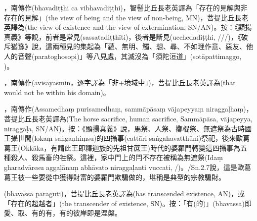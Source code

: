 \startitemgroup[noteitems]
\item{}，南傳作(bhavadiṭṭhi ca vibhavadiṭṭhi)，智髻比丘長老英譯為「存在的見解與非存在的見解」(the view of being and the view of non-being, MN)，菩提比丘長老英譯為(the view of existence and the view of extermination, SN/AN)。按：《顯揚真義》等說，前者是常見(sassatadiṭṭhīti)，後者是斷見(ucchedadiṭṭhi, ///)，《破斥猶豫》說，這兩種見的集起為「蘊、無明、觸、想、尋、不如理作意、惡友、他人的音聲(paratoghosopi)」等八見處，其滅沒為「須陀洹道」(sotāpattimaggo, )。
\stopitemgroup

\startitemgroup[noteitems]
\item{}，南傳作(avisayasmin，逐字譯為「非+境域中」)，菩提比丘長老英譯為(that would not be within his domain)。
\stopitemgroup

\startitemgroup[noteitems]
\item{}，南傳作(Assamedhaṃ purisamedhaṃ, sammāpāsaṃ vājapeyyaṃ niraggaḷhaṃ)，菩提比丘長老英譯為(The horse sacrifice, human sacrifice, Sammāpāsa, vājapeyya, niraggaḷa, SN/AN)。按：《顯揚真義》說，馬祭、人祭、擲棍祭、無遮祭為古時國王攝世間(lokaṃ saṅgaṇhiṃsu)的四攝事(cattāri saṅgahavatthūni)祭祀，後來歐葛葛王(Okkāka，有謂此王即釋迦族的先祖甘蔗王)時代的婆羅門轉變這四攝事為五種殺人、殺馬畜的牲祭。這裡，家中門上的閂不存在被稱為無遮祭(Idaṃ gharadvāresu aggaḷānaṃ abhāvato niraggaḷanti vuccati, /)。/Sn.2.7說，這是歐葛葛王被一些要從中獲得財富的婆羅門欺騙做的，堪稱是典型的宗教騙財。
\stopitemgroup

\startitemgroup[noteitems]
\item{}(bhavassa pāragūti)，菩提比丘長老英譯為(has transcended existence, AN)，或「存在的超越者」(the transcender of existence, SN)。按：「有(的)」(bhavassa)即愛、取、有的有，有的彼岸即是涅槃。
\stopitemgroup

